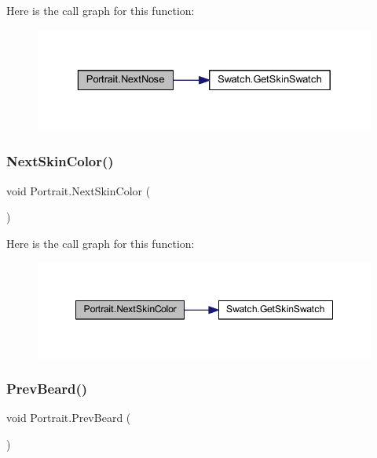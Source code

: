 Here is the call graph for this function\+:\nopagebreak
\begin{figure}[H]
\begin{center}
\leavevmode
\includegraphics[width=329pt]{class_portrait_a7fc2c7d9f078303182503c717c05b9d5_cgraph}
\end{center}
\end{figure}
\mbox{\label{class_portrait_a601ece8887c692a5a9f6d910fd3a2cec}} 
\subsubsection{\texorpdfstring{NextSkinColor()}{NextSkinColor()}}
{\footnotesize\ttfamily void Portrait.\+Next\+Skin\+Color (\begin{DoxyParamCaption}{ }\end{DoxyParamCaption})}

Here is the call graph for this function\+:\nopagebreak
\begin{figure}[H]
\begin{center}
\leavevmode
\includegraphics[width=348pt]{class_portrait_a601ece8887c692a5a9f6d910fd3a2cec_cgraph}
\end{center}
\end{figure}
\mbox{\label{class_portrait_ada91686eb3d44e5771a81dc147462258}} 
\subsubsection{\texorpdfstring{PrevBeard()}{PrevBeard()}}
{\footnotesize\ttfamily void Portrait.\+Prev\+Beard (\begin{DoxyParamCaption}{ }\end{DoxyParamCaption})}

